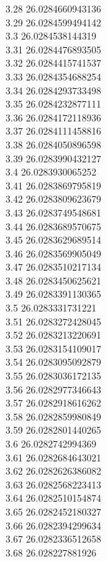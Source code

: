 {3.28	26.0284660943136\\
3.29	26.0284599494142\\
3.3	26.0284538144319\\
3.31	26.0284476893505\\
3.32	26.0284415741537\\
3.33	26.0284354688254\\
3.34	26.0284293733498\\
3.35	26.0284232877111\\
3.36	26.0284172118936\\
3.37	26.0284111458816\\
3.38	26.0284050896598\\
3.39	26.0283990432127\\
3.4	26.0283930065252\\
3.41	26.0283869795819\\
3.42	26.0283809623679\\
3.43	26.0283749548681\\
3.44	26.0283689570675\\
3.45	26.0283629689514\\
3.46	26.0283569905049\\
3.47	26.0283510217134\\
3.48	26.0283450625621\\
3.49	26.0283391130365\\
3.5	26.0283331731221\\
3.51	26.0283272428045\\
3.52	26.0283213220691\\
3.53	26.0283154109017\\
3.54	26.0283095092879\\
3.55	26.0283036172135\\
3.56	26.0282977346643\\
3.57	26.0282918616262\\
3.58	26.0282859980849\\
3.59	26.0282801440265\\
3.6	26.0282742994369\\
3.61	26.0282684643021\\
3.62	26.0282626386082\\
3.63	26.0282568223413\\
3.64	26.0282510154874\\
3.65	26.0282452180327\\
3.66	26.0282394299634\\
3.67	26.0282336512658\\
3.68	26.028227881926\\
}
